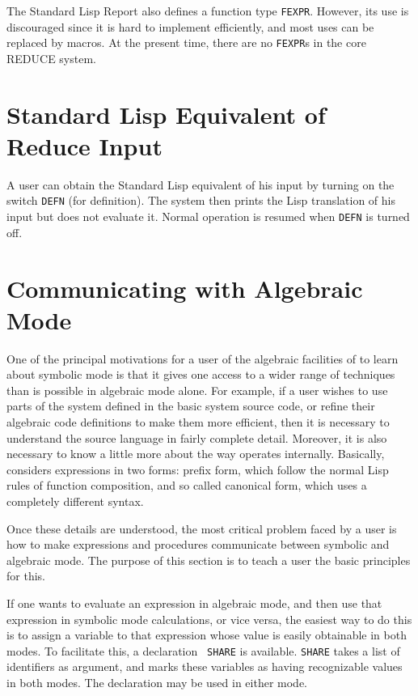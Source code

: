 The Standard Lisp Report also defines a function type {\tt FEXPR}.
However, its use is discouraged since it is hard to implement efficiently,
and most uses can be replaced by macros.  At the present time, there are
no {\tt FEXPR}s in the core REDUCE system.

\section{Standard Lisp Equivalent of Reduce Input}

A user can obtain the Standard Lisp equivalent of his {\REDUCE} input by
turning on the switch {\tt DEFN}  (for definition).  The
system then prints the Lisp translation of his input but does not evaluate
it.  Normal operation is resumed when {\tt DEFN} is turned off.

\section{Communicating with Algebraic Mode} 

One of the principal motivations for a user of the algebraic facilities of
{\REDUCE} to learn about symbolic mode  is that it
gives one access to a wider range of techniques than is possible in
algebraic mode  alone.  For example, if a user
wishes to use parts of the system defined in the basic system source code,
or refine their algebraic code definitions to make them more efficient,
then it is necessary to understand the source language in fairly complete
detail.  Moreover, it is also necessary to know a little more about the
way {\REDUCE} operates internally.  Basically, {\REDUCE} considers
expressions in two forms: prefix form, which follow the normal Lisp rules
of function composition, and so called canonical form, which uses a
completely different syntax.

Once these details are understood, the most critical problem faced by a
user is how to make expressions and procedures communicate between symbolic
and algebraic mode. The purpose of this section is to teach a user the
basic principles for this.

If one wants to evaluate an expression in algebraic mode, and then use
that expression in symbolic mode calculations, or vice versa, the easiest
way to do this is to assign a variable to that expression whose value is
easily obtainable in both modes.  To facilitate this, a declaration {\tt
SHARE}  is available. {\tt SHARE} takes a list of
identifiers as argument, and marks these variables as having recognizable
values in both modes.  The declaration may be used in either mode.

